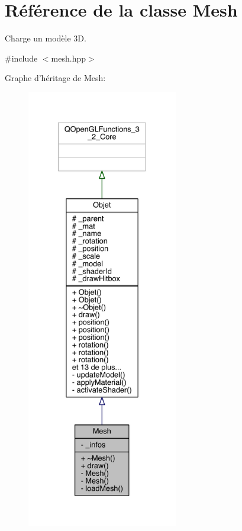 \hypertarget{class_mesh}{\section{Référence de la classe Mesh}
\label{class_mesh}
}


Charge un modèle 3\+D.  




{\ttfamily \#include $<$mesh.\+hpp$>$}



Graphe d'héritage de Mesh\+:
\nopagebreak
\begin{figure}[H]
\begin{center}
\leavevmode
\includegraphics[height=550pt]{class_mesh__inherit__graph}
\end{center}
\end{figure}


